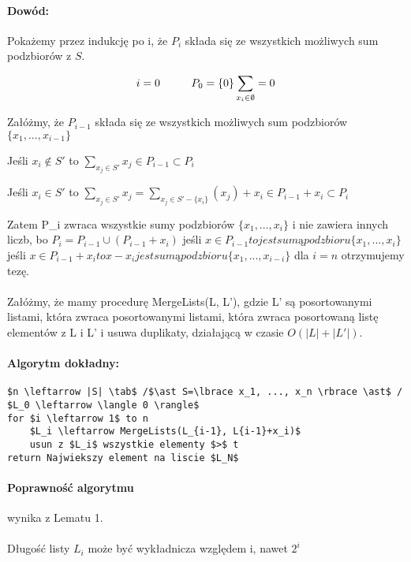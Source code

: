 \paragraph{Dowód:}{Pokażemy przez indukcję po i, że $P_i$ składa się ze wszystkich możliwych sum podzbiorów z $S$.

$$i = 0 \hspace*{1cm} P_0=\{0\} \sum_{x_i \in \emptyset} = 0$$

Załóżmy, że  $P_{i-1}$ składa się ze wszystkich możliwych sum podzbiorów $\{x_1, ..., x_{i-1}\}$ 

Jeśli $x_i \not\in S'$ to $\sum_{x_j \in S'} x_j \in P_{i-1} \subset P_i$

Jeśli $x_i \in S'$ to $\sum_{x_j \in S'} x_j = \sum_{x_j \in S' - \{x_i\}} (x_j) + x_i \in P_{i-1} + x_i \subset P_i$
 
Zatem P_i zwraca wszystkie sumy podzbiorów $\{ x_1, ..., x_i\}$ i nie zawiera innych liczb, bo $P_i = P_{i-1} \cup (P_{i-1} + x_i)$ 
jeśli $x \in P_{i-1} to jest sumą podzbioru \{ x_1, ..., x_i\} $
jeśli $x \in P_{i-1}+x_i to x-x_i jest sumą podzbioru \{ x_1, ..., x_{i-i}\} $
dla $i=n$ otrzymujemy tezę.

\paragraph{}{Załóżmy, że mamy procedurę MergeLists(L, L'), gdzie L' są posortowanymi listami, która zwraca posortowanymi listami, która zwraca posortowaną listę elementów z L i L' i usuwa duplikaty, działającą w czasie $O(|L|+|L'|)$.}

\paragraph{Algorytm dokładny:}
\begin{lstlisting}[caption={ExactSubsetSum(S,t)}]
$n \leftarrow |S| \tab$ /$\ast S=\lbrace x_1, ..., x_n \rbrace \ast$ /
$L_0 \leftarrow \langle 0 \rangle$
for $i \leftarrow 1$ to n
	$L_i \leftarrow MergeLists(L_{i-1}, L{i-1}+x_i)$
	usun z $L_i$ wszystkie elementy $>$ t
return Najwiekszy element na liscie $L_N$
\end{lstlisting}

\paragraph{Poprawność algorytmu}{wynika z Lematu 1.}

\paragraph{}{Długość listy $L_i$ może być wykładnicza względem i, nawet $2^i$}
}
